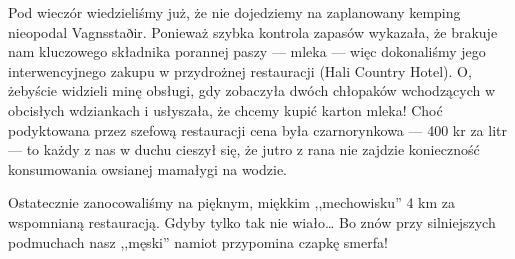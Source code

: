 Pod wieczór wiedzieliśmy już, że nie dojedziemy na zaplanowany kemping nieopodal Vagnsstaðir. Ponieważ szybka kontrola zapasów wykazała, że brakuje nam kluczowego składnika porannej paszy --- mleka --- więc dokonaliśmy jego interwencyjnego zakupu w przydrożnej restauracji (Hali Country Hotel). O, żebyście widzieli minę obsługi, gdy zobaczyła dwóch chłopaków wchodzących w obcisłych wdziankach i usłyszała, że chcemy kupić karton mleka! Choć podyktowana przez szefową restauracji cena była czarnorynkowa --- 400 kr za litr --- to każdy z nas w duchu cieszył się, że jutro z rana nie zajdzie konieczność konsumowania owsianej mamałygi na wodzie.

Ostatecznie zanocowaliśmy na pięknym, miękkim ,,mechowisku'' 4 km za wspomnianą restauracją. Gdyby tylko tak nie wiało… Bo znów przy silniejszych podmuchach nasz ,,męski'' namiot przypomina czapkę smerfa!